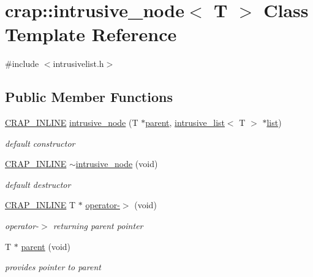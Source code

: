 \hypertarget{classcrap_1_1intrusive__node}{\section{crap\+:\+:intrusive\+\_\+node$<$ T $>$ Class Template Reference}
\label{classcrap_1_1intrusive__node}
}


{\ttfamily \#include $<$intrusivelist.\+h$>$}

\subsection*{Public Member Functions}
\begin{DoxyCompactItemize}
\item 
\hyperlink{config__x86_8h_a5a40526b8d842e7ff731509998bb0f1c}{C\+R\+A\+P\+\_\+\+I\+N\+L\+I\+N\+E} \hyperlink{classcrap_1_1intrusive__node_aa8313184bdab330161351d6f29fb689c}{intrusive\+\_\+node} (T $\ast$\hyperlink{classcrap_1_1intrusive__node_a64fa7fffc54fe23e13c2b42f610ac52c}{parent}, \hyperlink{singletoncrap_1_1intrusive__list}{intrusive\+\_\+list}$<$ T $>$ $\ast$\hyperlink{classcrap_1_1list}{list})
\begin{DoxyCompactList}\small\item\em default constructor \end{DoxyCompactList}\item 
\hyperlink{config__x86_8h_a5a40526b8d842e7ff731509998bb0f1c}{C\+R\+A\+P\+\_\+\+I\+N\+L\+I\+N\+E} \hyperlink{classcrap_1_1intrusive__node_ac158a93b90ccb4ca68bc8b2f9170dcfa}{$\sim$intrusive\+\_\+node} (void)
\begin{DoxyCompactList}\small\item\em default destructor \end{DoxyCompactList}\item 
\hyperlink{config__x86_8h_a5a40526b8d842e7ff731509998bb0f1c}{C\+R\+A\+P\+\_\+\+I\+N\+L\+I\+N\+E} T $\ast$ \hyperlink{classcrap_1_1intrusive__node_abde18cd1dac827f8480044ef588cdcbb}{operator-\/$>$} (void)
\begin{DoxyCompactList}\small\item\em operator-\/$>$ returning parent pointer \end{DoxyCompactList}\item 
T $\ast$ \hyperlink{classcrap_1_1intrusive__node_a64fa7fffc54fe23e13c2b42f610ac52c}{parent} (void)
\begin{DoxyCompactList}\small\item\em provides pointer to parent \end{DoxyCompactList}\item 

\end{DoxyCompactItemize}
